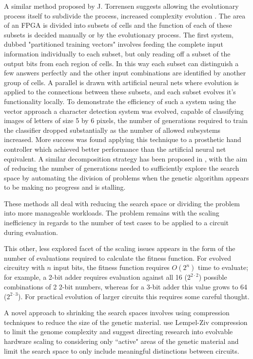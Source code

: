 A similar method proposed by J. Torrensen suggests allowing the evolutionary
process itself to subdivide the process, increased complexity evolution \cite{Torresen2002}. The area
of an FPGA is divided into subsets of cells and the function of each of these
subsets is decided manually or by the evolutionary process.
The first system, dubbed "partitioned training vectors" involves feeding the
complete input information individually to each subset, but only reading off
a subset of the output bits from each region of cells. In this way each subset
can distinguish a few answers perfectly and the other input combinations are
identified by another group of cells.
A parallel is drawn
with artificial neural nets where evolution is applied to the connections between
these subsets, and each subset evolves it's functionality locally. To demonstrate
the efficiency of such a system using the vector approach a character detection system was evolved, capable
of classifying images of letters of size 5 by 6 pixels, the number of generations
required to train the classifier dropped substantially as the number of allowed subsystems
increased. More success was found applying this technique to a prosthetic hand controller
which achieved better performance than the artificial neural net equivalent.
A similar decomposition strategy has been proposed in \cite{1703646}, with the
aim of reducing the number of generations needed to sufficiently explore the search
space by automating the division of problems when the genetic algorithm appears to
be making no progress and is stalling.

These methods all deal with reducing the search space or dividing the problem into
more manageable workloads. The problem remains with the scaling inefficiency in
regards to the number of test cases to be applied to a circuit during evaluation.

This other, less explored facet of the scaling issues appears in the form of the number of
evaluations required to calculate the fitness function. For evolved circuitry
with $n$ input bits, the fitness function requires $O(2^{n})$ time to evaluate;
for example, a 2-bit adder requires evaluation against all 16 ($2^{2 \cdot 2}$) possible combinations
of 2 2-bit numbers, whereas for a 3-bit adder this value grows to 64 ($2^{2 \cdot 3}$).
For practical evolution of larger circuits this requires some careful thought.

A novel approach to shrinking the search spaces involves using compression
techniques to reduce the size of the genetic material. \cite{1508485} use
Lempel-Ziv compression to limit the genome complexity and suggest directing
research into evolvable hardware scaling to considering only ``active" areas
of the genetic material and limit the search space to only include meaningful
distinctions between circuits.

